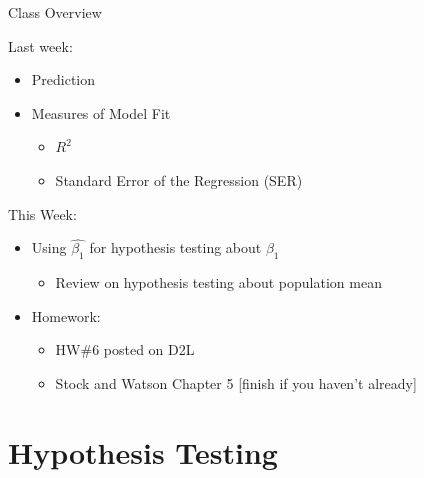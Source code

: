 \documentclass[
  8pt,
  ignorenonframetext,
  dvipsnames]{beamer}
\providecommand{\tightlist}{%
  \setlength{\itemsep}{0pt}\setlength{\parskip}{0pt}}
\let\olditem\item
\renewcommand{\item}{%
  \olditem\vspace{4pt}
}
\begin{document}
\begin{frame}{Class Overview}
\protect\hypertarget{class-overview}{}

Last week:

\begin{itemize}
\tightlist
\item
  Prediction
\item
  Measures of Model Fit

  \begin{itemize}
  \tightlist
  \item
    \(R^2\)
  \item
    Standard Error of the Regression (SER)
  \end{itemize}
\end{itemize}

\medskip

This Week:

\begin{itemize}
\tightlist
\item
  Using \(\hat{\beta_1}\) for hypothesis testing about \(\beta_1\)

  \begin{itemize}
  \tightlist
  \item
    Review on hypothesis testing about population mean
  \end{itemize}
\item
  Homework:

  \begin{itemize}
  \tightlist
  \item
    HW\#6 posted on D2L
  \item
    Stock and Watson Chapter 5 {[}finish if you haven't already{]}
  \end{itemize}
\end{itemize}

\end{frame}

\hypertarget{hypothesis-testing}{%
\section{Hypothesis Testing}\label{hypothesis-testing}}
\end{document}
